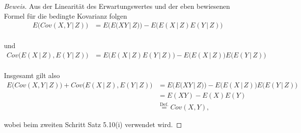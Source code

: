 \documentclass[10pt]{article}
\newcommand{\gap}{\,\vert\,}
\begin{document}
\begin{proof}[Beweis] Aus der Linearität des Erwartungswertes und der eben bewiesenen Formel für die bedingte Kovarianz folgen
	\begin{align*}
		E\big(Cov(X,Y \gap Z)\big) &= E\big( E\big( XY \gap Z \big) \big) - E\big(E(X \gap Z)E(Y \gap Z)\big) \\
	\end{align*}
	
	und
	\begin{align*}
		Cov\big(E(X \gap Z), E(Y \gap Z)\big) &=  E\big(E(X \gap Z)E(Y \gap Z)\big) - E\big(E(X \gap Z)\big)E\big(E(Y \gap Z)\big) \\
	\end{align*}

	Insgesamt gilt also 
	\begin{align*}
		E\big(Cov(X,Y \gap Z)\big) + Cov\big(E(X \gap Z), E(Y \gap Z)\big) &= E\big( E\big( XY \gap Z \big) \big) - 
																			 E\big(E(X \gap Z)\big)E\big(E(Y \gap Z)\big)  \\
																		&= E(XY) - E(X)E(Y) 							  \\
																		&\overset{\text{Def.}}{=} Cov(X,Y),
	\end{align*}

	wobei beim zweiten Schritt Satz 5.10(i) verwendet wird.
\end{proof}
\end{document}
